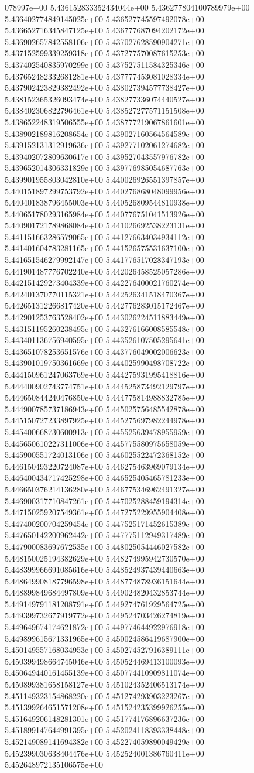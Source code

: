 078997e+00	5.436152833352434044e+00	5.436277804100789979e+00	5.436402774849145025e+00	5.436527745597492078e+00	5.436652716345847125e+00	5.436777687094202172e+00	5.436902657842558106e+00	5.437027628590904271e+00	5.437152599339259318e+00	5.437277570087615253e+00	5.437402540835970299e+00	5.437527511584325346e+00	5.437652482332681281e+00	5.437777453081028334e+00	5.437902423829382492e+00	5.438027394577738427e+00	5.438152365326093474e+00	5.438277336074440527e+00	5.438402306822796461e+00	5.438527277571151508e+00	5.438652248319506555e+00	5.438777219067861601e+00	5.438902189816208654e+00	5.439027160564564589e+00	5.439152131312919636e+00	5.439277102061274682e+00	5.439402072809630617e+00	5.439527043557976782e+00	5.439652014306331829e+00	5.439776985054687763e+00	5.439901955803042810e+00	5.440026926551397857e+00	5.440151897299753792e+00	5.440276868048099956e+00	5.440401838796455003e+00	5.440526809544810938e+00	5.440651780293165984e+00	5.440776751041513926e+00	5.440901721789868084e+00	5.441026692538223131e+00	5.441151663286579065e+00	5.441276634034934112e+00	5.441401604783281165e+00	5.441526575531637100e+00	5.441651546279992147e+00	5.441776517028347193e+00	5.441901487776702240e+00	5.442026458525057286e+00	5.442151429273404339e+00	5.442276400021760274e+00	5.442401370770115321e+00	5.442526341518470367e+00	5.442651312266817420e+00	5.442776283015172467e+00	5.442901253763528402e+00	5.443026224511883449e+00	5.443151195260238495e+00	5.443276166008585548e+00	5.443401136756940595e+00	5.443526107505295641e+00	5.443651078253651576e+00	5.443776049002006623e+00	5.443901019750361669e+00	5.444025990498708722e+00	5.444150961247063769e+00	5.444275931995418816e+00	5.444400902743774751e+00	5.444525873492129797e+00	5.444650844240476850e+00	5.444775814988832785e+00	5.444900785737186943e+00	5.445025756485542878e+00	5.445150727233897925e+00	5.445275697982244978e+00	5.445400668730600913e+00	5.445525639478955959e+00	5.445650610227311006e+00	5.445775580975658059e+00	5.445900551724013106e+00	5.446025522472368152e+00	5.446150493220724087e+00	5.446275463969079134e+00	5.446400434717425298e+00	5.446525405465781233e+00	5.446650376214136280e+00	5.446775346962491327e+00	5.446900317710847261e+00	5.447025288459194314e+00	5.447150259207549361e+00	5.447275229955904408e+00	5.447400200704259454e+00	5.447525171452615389e+00	5.447650142200962442e+00	5.447775112949317489e+00	5.447900083697672535e+00	5.448025054446027582e+00	5.448150025194382629e+00	5.448274995942730570e+00	5.448399966691085616e+00	5.448524937439440663e+00	5.448649908187796598e+00	5.448774878936151644e+00	5.448899849684497809e+00	5.449024820432853744e+00	5.449149791181208791e+00	5.449274761929564725e+00	5.449399732677919772e+00	5.449524703426274819e+00	5.449649674174621872e+00	5.449774644922976918e+00	5.449899615671331965e+00	5.450024586419687900e+00	5.450149557168034953e+00	5.450274527916389111e+00	5.450399498664745046e+00	5.450524469413100093e+00	5.450649440161455139e+00	5.450774410909811074e+00	5.450899381658158127e+00	5.451024352406513174e+00	5.451149323154868220e+00	5.451274293903223267e+00	5.451399264651571208e+00	5.451524235399926255e+00	5.451649206148281301e+00	5.451774176896637236e+00	5.451899147644991395e+00	5.452024118393338448e+00	5.452149089141694382e+00	5.452274059890049429e+00	5.452399030638404476e+00	5.452524001386760411e+00	5.452648972135106575e+00	